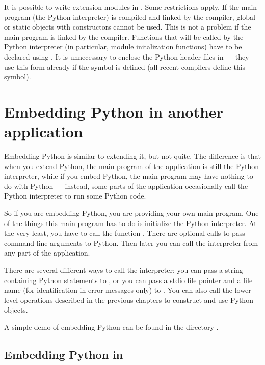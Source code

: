 \documentclass{manual}
\begin{document}
It is possible to write extension modules in \Cpp{}.  Some restrictions
apply.  If the main program (the Python interpreter) is compiled and
linked by the \C{} compiler, global or static objects with constructors
cannot be used.  This is not a problem if the main program is linked
by the \Cpp{} compiler.  Functions that will be called by the
Python interpreter (in particular, module initalization functions)
have to be declared using .
It is unnecessary to enclose the Python header files in
 --- they use this form already if the symbol
 is defined (all recent \Cpp{} compilers define this
symbol).

\chapter{Embedding Python in another application}
\label{embedding}

Embedding Python is similar to extending it, but not quite.  The
difference is that when you extend Python, the main program of the
application is still the Python interpreter, while if you embed
Python, the main program may have nothing to do with Python ---
instead, some parts of the application occasionally call the Python
interpreter to run some Python code.

So if you are embedding Python, you are providing your own main
program.  One of the things this main program has to do is initialize
the Python interpreter.  At the very least, you have to call the
function .  There are optional calls to
pass command line arguments to Python.  Then later you can call the
interpreter from any part of the application.

There are several different ways to call the interpreter: you can pass
a string containing Python statements to
, or you can pass a stdio file pointer
and a file name (for identification in error messages only) to
.  You can also call the lower-level
operations described in the previous chapters to construct and use
Python objects.

A simple demo of embedding Python can be found in the directory
.


\section{Embedding Python in \Cpp{}}
\label{embeddingInCplusplus}
\end{document}
